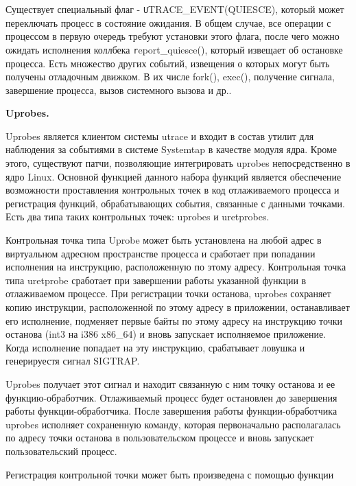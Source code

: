 

\bigskip 
Существует специальный флаг - {\texttt UTRACE\_EVENT(QUIESCE)}, 
который может переключать процесс в состояние ожидания. В общем 
случае, все операции с процессом в первую очередь требуют 
установки этого флага, после чего можно ожидать исполнения 
коллбека {\texttt report\_quiesce()}, который извещает об 
остановке процесса. Есть множество других событий, извещения 
о которых могут быть получены отладочным движком. В их числе 
fork(), exec(), получение сигнала, завершение процесса, вызов 
системного вызова и др..

\bigskip
{\bfseries Uprobes.}

\bigskip
Uprobes является клиентом системы utrace и входит в состав утилит для 
наблюдения за событиями в системе Systemtap в качестве модуля ядра. 
Кроме этого, существуют патчи, позволяющие интегрировать uprobes 
непосредственно в ядро Linux. Основной функцией данного набора функций 
является обеспечение возможности проставления контрольных точек в код 
отлаживаемого процесса и регистрация функций, обрабатывающих события, 
связанные с данными точками. Есть два типа таких контрольных точек: 
uprobes и uretprobes. 

Контрольная точка типа Uprobe может быть установлена на любой адрес в 
виртуальном адресном пространстве процесса и сработает при попадании 
исполнения на инструкцию, расположенную по этому адресу. Контрольная
точка типа uretprobe сработает при завершении работы указанной функции
в отлаживаемом процессе. При регистрации точки останова, uprobes сохраняет
копию инструкции, расположенной по этому адресу в приложении, останавливает 
его исполнение, подменяет первые байты по этому адресу на инструкцию 
точки останова (int3 на i386 x86\_64) и вновь запускает исполняемое 
приложение. Когда исполнение попадает на эту инструкцию, срабатывает 
ловушка и генерируестя сигнал SIGTRAP.

Uprobes получает этот сигнал и 
находит связанную с ним точку останова и ее функцию-обработчик. 
Отлаживаемый процесс будет остановлен до завершения работы 
функции-обработчика. После завершения работы функции-обработчика uprobes 
исполняет сохраненную команду, которая первоначально располагалась 
по адресу точки останова в пользовательском процессе и вновь запускает 
пользовательский процесс.   

Регистрация контрольной точки может быть произведена с помощью функции
 
